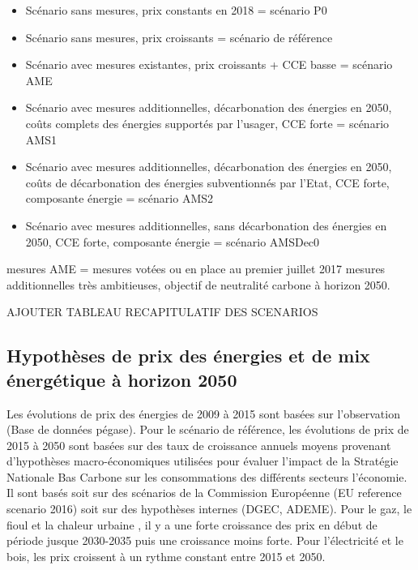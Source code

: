 \documentclass[10.5pt,a4paper]{article}
\begin{document}
{\begin{itemize}
\item Scénario sans mesures, prix constants en 2018 = scénario P0
\item Scénario sans mesures, prix croissants = scénario de référence
\item Scénario avec mesures existantes, prix croissants + CCE basse = scénario AME
\item Scénario avec mesures additionnelles, décarbonation des énergies en 2050, coûts complets des énergies supportés par l'usager, CCE forte = scénario AMS1
\item Scénario avec mesures additionnelles, décarbonation des énergies en 2050, coûts de décarbonation des énergies subventionnés par l'Etat, CCE forte, composante énergie  = scénario AMS2
\item Scénario avec mesures additionnelles, sans décarbonation des énergies en 2050, CCE forte, composante énergie = scénario AMSDec0
\end{itemize}

mesures AME = mesures votées ou en place au premier juillet 2017
mesures additionnelles très ambitieuses, objectif de neutralité carbone à horizon 2050.

AJOUTER TABLEAU RECAPITULATIF DES SCENARIOS

\subsection{Hypothèses de prix des énergies et de mix énergétique à horizon 2050}


Les évolutions de prix des énergies de 2009 à 2015 sont basées sur l’observation (Base de données pégase).  Pour le scénario  de référence, les évolutions de prix de 2015 à 2050 sont basées sur des taux de croissance annuels moyens provenant d'hypothèses macro-économiques utilisées pour évaluer l'impact de la Stratégie Nationale Bas Carbone sur les consommations des différents secteurs l'économie. Il sont basés soit sur des scénarios de la Commission Européenne (EU reference scenario 2016) soit sur des hypothèses internes (DGEC, ADEME). Pour le gaz, le fioul et la chaleur urbaine , il y a une forte croissance des prix en début de période jusque 2030-2035 puis une croissance moins forte. Pour l'électricité et le bois, les prix croissent à un rythme constant entre 2015 et 2050. 

}
\end{document}
